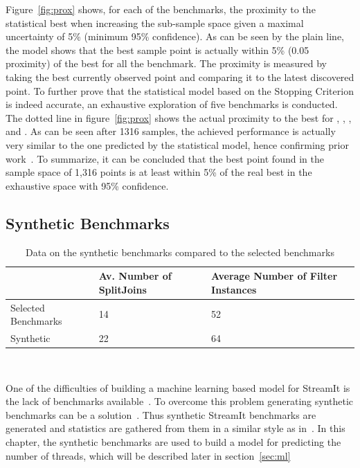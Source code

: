 Figure~\ref{fig:prox} shows, for each of the benchmarks, the proximity to the statistical best when increasing the sub-sample space given a maximal uncertainty of 5\%  (\ie minimum 95\% confidence).
As can be seen by the plain line, the model shows that the best sample point is actually within 5\% (0.05 proximity) of the best for all the benchmark.
The proximity is measured by taking the best currently observed point and comparing it to the latest discovered point.
To further prove that the statistical model based on the Stopping Criterion is indeed accurate, an exhaustive exploration of five benchmarks is conducted.
The dotted line in figure~\ref{fig:prox} shows the actual proximity to the best for , , ,  and .
As can be seen after 1316 samples, the achieved performance is actually very similar to the one predicted by the statistical model, hence confirming prior work~\cite{vuduc2003AutomaticPerf}.
To summarize, it can be concluded that the best point found in the sample space of 1,316 points is at least within 5\% of the real best in the exhaustive space with 95\% confidence.

\subsection{Synthetic Benchmarks}

\begin{table}[t]
  \small
 \begin{tabular} { | l | l | l | }
 \hline
 & Av. Number of SplitJoins & Average Number of Filter Instances \\ \hline
 Selected Benchmarks & 14 & 52 \\ \hline 
 Synthetic & 22 & 64 \\ \hline
 \end{tabular}
 \caption{Data on the synthetic benchmarks compared to the selected benchmarks}~\label{tab:synthvsreal}
 \end{table}

One of the difficulties of building a machine learning based model for StreamIt is the lack of benchmarks available~\cite{wang2013partitionstreamit}.
To overcome this problem generating synthetic benchmarks can be a solution~\cite{cumminsopencl2017}.
Thus synthetic StreamIt benchmarks are generated and statistics are gathered from them in a similar style as in~\cite{wang2013partitionstreamit}.
In this chapter, the synthetic benchmarks are used to build a model for predicting the number of threads, which will be described later in section~\ref{sec:ml}

